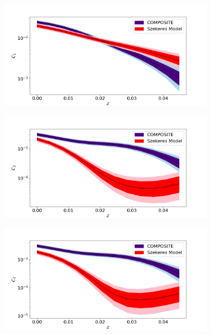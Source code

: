 \documentclass[a4paper,12pt]{report}
\begin{document}
\begin{figure}[t]
\begin{subfigure}[b]{0.45\textwidth}
        \caption{}
    \end{subfigure}
    \begin{subfigure}[b]{0.45\textwidth}
        \centering
        \includegraphics[width=\textwidth]{BNW Model MCMC/Special Geometry One/COMPOSITE/Hub C1.png}
        \caption{}
    \end{subfigure}
    \begin{subfigure}[b]{0.45\textwidth}
        \centering
        \includegraphics[width=\textwidth]{BNW Model MCMC/Special Geometry One/CMB/Hub C2.png}
        \caption{}
    \end{subfigure}
    \begin{subfigure}[b]{0.45\textwidth}
        \centering
        \includegraphics[width=\textwidth]{BNW Model MCMC/Special Geometry One/COMPOSITE/Hub C2.png}

\end{subfigure}
\end{figure}
\end{document}
